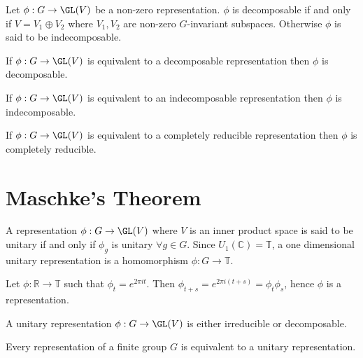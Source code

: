 \begin{defi}
	Let $\phi : G \to \GL(V)$ be a non-zero representation. $\phi$ is decomposable if and only if $V = V_1 \oplus V_2$ where $V_1,V_2$ are non-zero $G$-invariant subspaces. Otherwise $\phi$ is said to be indecomposable.
\end{defi}

\begin{lemm}
	If $\phi : G \to \GL(V)$ is equivalent to a decomposable representation then $\phi$ is decomposable.
\end{lemm}

\begin{lemm}
	If $\phi : G \to \GL(V)$ is equivalent to an indecomposable representation then $\phi$ is indecomposable.
\end{lemm}

\begin{lemm}
	If $\phi : G \to \GL(V)$ is equivalent to a completely reducible representation then $\phi$ is completely reducible.
\end{lemm}



\newpage
\section{Maschke's Theorem}
\begin{defi}
	A representation $\phi : G \to \GL(V)$ where $V$ is an inner product space is said to be unitary if and only if $\phi_g$ is unitary $\forall g \in G$. Since $U_1(\mathbb{C}) = \mathbb{T}$, a one dimensional unitary representation is a homomorphism $\phi : G \to \mathbb{T}$.
\end{defi}

\begin{exam}
	Let $\phi : \mathbb{R} \to \mathbb{T}$ such that $\phi_t = e^{2 \pi i t}$. Then $\phi_{t+s} = e^{2 \pi i (t+s)} = \phi_t\phi_s$, hence $\phi$ is a representation.
\end{exam}

\begin{prop}
	A unitary representation $\phi : G \to \GL(V)$ is either irreducible or decomposable.
\end{prop}

\begin{prop}
	Every representation of a finite group $G$ is equivalent to a unitary representation.
\end{prop}

